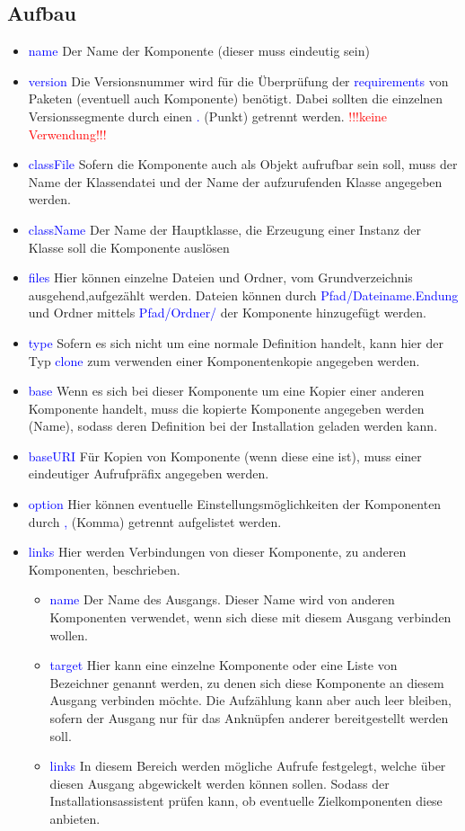 \documentclass[10pt,a4paper,final,parskip]{scrartcl}
\numberwithin{equation}{section}
\newcommand{\blau}[1]{\textcolor{blue}{#1}}
\newcommand{\nicht}{\textcolor{red}{!!!keine Verwendung!!!}}
\begin{document}
\subsection{Aufbau}
\begin{itemize}
\item \blau{name} Der Name der Komponente (dieser muss eindeutig sein)
\item \blau{version} Die Versionsnummer wird für die Überprüfung der \blau{requirements} von Paketen (eventuell auch Komponente) benötigt. Dabei sollten die einzelnen Versionssegmente durch einen \blau{.} (Punkt) getrennt werden. \nicht
\item \blau{classFile} Sofern die Komponente auch als Objekt aufrufbar sein soll, muss der Name der Klassendatei und der Name der aufzurufenden Klasse angegeben werden.
\item \blau{className} Der Name der Hauptklasse, die Erzeugung einer Instanz der Klasse soll die Komponente auslösen
\item \blau{files} Hier können einzelne Dateien und Ordner, vom Grundverzeichnis ausgehend,aufgezählt werden. Dateien können durch \blau{Pfad/Dateiname.Endung} und Ordner mittels \blau{Pfad/Ordner/} der Komponente hinzugefügt werden.

\item \blau{type} Sofern es sich nicht um eine normale Definition handelt, kann hier der Typ \blau{clone} zum verwenden einer Komponentenkopie angegeben werden.
\item \blau{base} Wenn es sich bei dieser Komponente um eine Kopier einer anderen Komponente handelt, muss die kopierte Komponente angegeben werden (Name), sodass deren Definition bei der Installation geladen werden kann.
\item \blau{baseURI} Für Kopien von Komponente (wenn diese eine ist), muss einer eindeutiger Aufrufpräfix angegeben werden.
\item \blau{option} Hier können eventuelle Einstellungsmöglichkeiten der Komponenten durch \blau{,} (Komma) getrennt aufgelistet werden.

\item \blau{links} Hier werden Verbindungen von dieser Komponente, zu anderen Komponenten, beschrieben.
\begin{itemize}
\item \blau{name} Der Name des Ausgangs. Dieser Name wird von anderen Komponenten verwendet, wenn sich diese mit diesem Ausgang verbinden wollen.
\item \blau{target} Hier kann eine einzelne Komponente oder eine Liste von Bezeichner genannt werden, zu denen sich diese Komponente an diesem Ausgang verbinden möchte. Die Aufzählung kann aber auch leer bleiben, sofern der Ausgang nur für das Anknüpfen anderer bereitgestellt werden soll.
\item \blau{links} In diesem Bereich werden mögliche Aufrufe festgelegt, welche über diesen Ausgang abgewickelt werden können sollen. Sodass der Installationsassistent prüfen kann, ob eventuelle Zielkomponenten diese anbieten.
\end{itemize}


\end{itemize}
\end{document}
